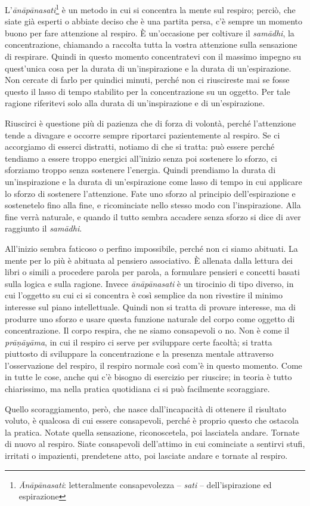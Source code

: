 
L'\textit{ānāpānasati}\footnote{\textit{Ānāpānasati}: letteralmente consapevolezza – \textit{sati} –
dell'ispirazione ed espirazione} è un metodo in cui si concentra la mente sul
respiro; perciò, che siate già esperti o abbiate deciso che è una
partita persa, c'è sempre un momento buono per fare attenzione al
respiro. È un'occasione per coltivare il \textit{samādhi}, la concentrazione,
chiamando a raccolta tutta la vostra attenzione sulla sensazione di
respirare. Quindi in questo momento concentratevi con il massimo impegno
su quest'unica cosa per la durata di un'inspirazione e la durata di
un'espirazione. Non cercate di farlo per quindici minuti, perché non ci
riuscireste mai se fosse questo il lasso di tempo stabilito per la
concentrazione su un oggetto. Per tale ragione riferitevi solo alla
durata di un'inspirazione e di un'espirazione.

Riuscirci è questione più di pazienza che di forza di volontà, perché
l'attenzione tende a divagare e occorre sempre riportarci pazientemente
al respiro. Se ci accorgiamo di esserci distratti, notiamo di che si
tratta: può essere perché tendiamo a essere troppo energici all'inizio
senza poi sostenere lo sforzo, ci sforziamo troppo senza sostenere
l'energia. Quindi prendiamo la durata di un'inspirazione e la durata di
un'espirazione come lasso di tempo in cui applicare lo sforzo di
sostenere l'attenzione. Fate uno sforzo al principio dell'espirazione e
sostenetelo fino alla fine, e ricominciate nello stesso modo con
l'inspirazione. Alla fine verrà naturale, e quando il tutto sembra
accadere senza sforzo si dice di aver raggiunto il \textit{samādhi}.

All'inizio sembra faticoso o perfino impossibile, perché non ci siamo
abituati. La mente per lo più è abituata al pensiero associativo. È
allenata dalla lettura dei libri o simili a procedere parola per parola,
a formulare pensieri e concetti basati sulla logica e sulla ragione.
Invece \textit{ānāpānasati} è un tirocinio di tipo diverso, in cui l'oggetto su
cui ci si concentra è così semplice da non rivestire il minimo interesse
sul piano intellettuale. Quindi non si tratta di provare interesse, ma
di produrre uno sforzo e usare questa funzione naturale del corpo come
oggetto di concentrazione. Il corpo respira, che ne siamo consapevoli o
no. Non è come il \textit{prāṇāyāma}, in cui il respiro ci serve per sviluppare
certe facoltà; si tratta piuttosto di sviluppare la concentrazione e la
presenza mentale attraverso l'osservazione del respiro, il respiro
normale così com'è in questo momento. Come in tutte le cose, anche qui
c'è bisogno di esercizio per riuscire; in teoria è tutto chiarissimo, ma
nella pratica quotidiana ci si può facilmente scoraggiare.

Quello scoraggiamento, però, che nasce dall'incapacità di ottenere il
risultato voluto, è qualcosa di cui essere consapevoli, perché è proprio
questo che ostacola la pratica. Notate quella sensazione, riconoscetela,
poi lasciatela andare. Tornate di nuovo al respiro. Siate consapevoli
dell'attimo in cui cominciate a sentirvi stufi, irritati o impazienti,
prendetene atto, poi lasciate andare e tornate al respiro.

